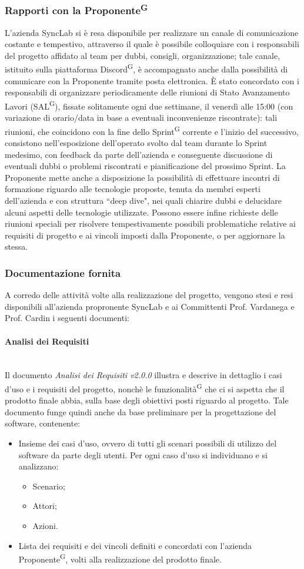 \documentclass[8pt]{article}
\newcommand{\glossterm}[1]{#1\textsuperscript{G}} %
\newcommand{\subsubsubsection}[1]{\paragraph{#1}\mbox{}\\}
\begin{document}
\subsubsection{Rapporti con la \glossterm{Proponente}} 
L'azienda SyncLab si è resa disponibile per realizzare un canale di comunicazione costante e
tempestivo, attraverso il quale è possibile colloquiare con i responsabili del progetto affidato al
team per dubbi, consigli, organizzazione; tale canale, istituito sulla piattaforma
\glossterm{Discord}, è accompagnato anche dalla possibilità di comunicare con la Proponente tramite
posta elettronica. È stato concordato con i responsabili di organizzare periodicamente delle
riunioni di Stato Avanzamento Lavori (\glossterm{SAL}), fissate solitamente ogni due settimane, il
venerdì alle 15:00 (con variazione di orario/data in base a eventuali inconvenienze riscontrate):
tali riunioni, che coincidono con la fine dello \glossterm{Sprint} corrente e l'inizio del
successivo, consistono nell'esposizione dell'operato svolto dal team durante lo Sprint medesimo, con
feedback da parte dell'azienda e conseguente discussione di eventuali dubbi o problemi
riscontrati e pianificazione del prossimo Sprint.
La Proponente mette anche a disposizione la possibilità di effettuare incontri di formazione
riguardo alle tecnologie proposte, tenuta da membri esperti dell'azienda e con struttura ``deep
dive", nei quali chiarire dubbi e delucidare alcuni aspetti delle tecnologie utilizzate. 
Possono essere infine richieste delle riunioni speciali per risolvere tempestivamente possibili
problematiche relative ai requisiti di progetto e ai vincoli imposti dalla Proponente, o per
aggiornare la stessa.
\clearpage
\subsubsection{Documentazione fornita}
A corredo delle attività volte alla realizzazione del progetto, vengono stesi e resi disponibili
all'azienda propronente SyncLab e ai Committenti Prof. Vardanega e Prof. Cardin i seguenti documenti:
\subsubsubsection{Analisi dei Requisiti} \label{sec:ar1}
Il documento \textit{Analisi dei Requisiti v2.0.0} illustra e descrive in dettaglio i casi d'uso e i requisiti del progetto, nonchè le \glossterm{funzionalità} che ci si aspetta che il prodotto finale abbia, sulla base degli obiettivi posti riguardo al progetto. Tale documento funge quindi anche da base preliminare per la progettazione del software, contenente:
\begin{itemize}
    \item Insieme dei casi d'uso, ovvero di tutti gli scenari possibili di utilizzo del software da
        parte degli utenti. Per ogni caso d'uso si individuano e si analizzano: 
    \begin{itemize}
        \item Scenario;
        \item Attori;
        \item Azioni.
    \end{itemize} 
    \item Lista dei requisiti e dei vincoli definiti e concordati con l'azienda \glossterm{Proponente}, volti alla realizzazione del prodotto finale.
\end{itemize}
\end{document}
